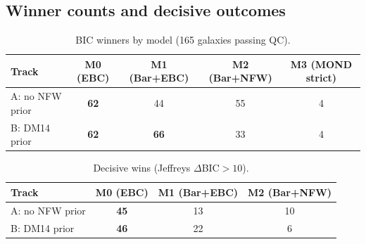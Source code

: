 \documentclass[12pt]{article}
\begin{document}
\subsection*{Winner counts and decisive outcomes}
\begin{table}[H]
\centering
\caption{BIC winners by model (165 galaxies passing QC).}
\label{tab:wins}
\begin{tabular}{lcccc}
\toprule
Track & M0 (EBC) & M1 (Bar+EBC) & M2 (Bar+NFW) & M3 (MOND strict) \\
\midrule
A: no NFW prior & \textbf{62} & 44 & 55 & 4 \\
B: DM14 prior   & \textbf{62} & \textbf{66} & 33 & 4 \\
\bottomrule
\end{tabular}
\end{table}

\begin{table}[H]
\centering
\caption{Decisive wins (Jeffreys $\Delta$BIC$>10$).}
\label{tab:decisive}
\begin{tabular}{lccc}
\toprule
Track & M0 (EBC) & M1 (Bar+EBC) & M2 (Bar+NFW) \\
\midrule
A: no NFW prior & \textbf{45} & 13 & 10 \\
B: DM14 prior   & \textbf{46} & 22 & 6 \\
\bottomrule
\end{tabular}
\end{table}
\end{document}
